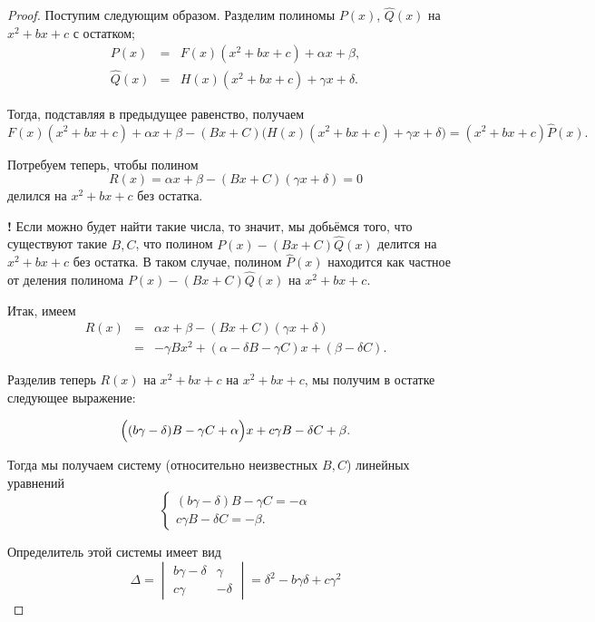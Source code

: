 \begin{proof}
Поступим следующим образом. Разделим полиномы $P(x)$, $\widehat{Q}(x)$ на $x^2 + bx + c$ с остатком;
\begin{eqnarray*}
    P(x) &=& F(x)(x^2 + bx + c) + \alpha x + \beta, \\
    \widehat{Q}(x) &=& H(x)(x^2 + bx + c) + \gamma x + \delta.
\end{eqnarray*}

Тогда, подставляя в предыдущее равенство, получаем
\[
 F(x)(x^2 + bx + c) + \alpha x + \beta - (Bx +C) \bigl( H(x)(x^2 + bx + c) + \gamma x + \delta\bigr) = (x^2 + bx + c) \widehat{P}(x).
\]

Потребуем теперь, чтобы полином
\[
 R(x) = \alpha x + \beta  - (Bx + C) (\gamma x +\delta ) =0
\]
делился на $x^2 + bx + c$ без остатка.

\begin{mydanger}{\bf !}
 Если можно будет найти такие числа, то значит, мы добьёмся того, что существуют такие $B,C$, что полином $P(x) - (Bx + C)\widehat{Q}(x)$ делится на $x^2 + bx + c$ без остатка. В таком случае, полином $\widehat{P}(x)$ находится как частное от деления полинома $P(x) - (Bx + C)\widehat{Q}(x)$ на $x^2 + bx + c$.  
\end{mydanger}

Итак, имеем
\begin{eqnarray*}
    R(x) &=& \alpha x + \beta  - (Bx + C) (\gamma x +\delta )  \\
    &=& - \gamma B x^2 + (\alpha - \delta B - \gamma C)x + (\beta - \delta C).
\end{eqnarray*}

Разделив теперь $R(x)$ на $x^2 + bx +c $ на $x^2 + bx +c$, мы получим в остатке следующее выражение:

\[
 \Bigl( (b \gamma - \delta)B - \gamma C  + \alpha \Bigr)x + c \gamma B - \delta C + \beta.
\]

Тогда мы получаем систему (относительно неизвестных $B,C$) линейных уравнений
\[
 \begin{cases}
     (b \gamma - \delta)B - \gamma C =- \alpha \\
      c \gamma B - \delta C =- \beta.
 \end{cases}
\]

Определитель этой системы имеет вид
\[
\Delta = \begin{vmatrix}
     b \gamma - \delta & \gamma \\
     c\gamma & -\delta
 \end{vmatrix} = \delta^2 - b\gamma \delta + c \gamma^2
\]


\end{proof}
